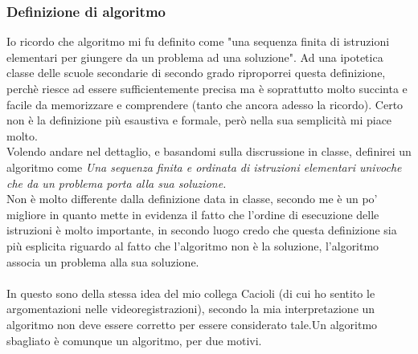 \documentclass[a4paper]{article}
\begin{document}
\subsubsection{Definizione di algoritmo}
Io ricordo che algoritmo mi fu definito come "una sequenza finita di istruzioni elementari per giungere da un problema ad una soluzione". Ad una ipotetica classe delle scuole secondarie di secondo grado riproporrei questa definizione, perchè riesce ad essere sufficientemente precisa ma è soprattutto molto succinta e facile da memorizzare e comprendere (tanto che ancora adesso la ricordo). Certo non è la definizione più esaustiva e formale, però nella sua semplicità mi piace molto.\\
Volendo andare nel dettaglio, e basandomi sulla discrussione in classe, definirei un algoritmo come \emph{Una sequenza finita e ordinata di istruzioni elementari univoche che da un problema porta alla sua soluzione.}\\
Non è molto differente dalla definizione data in classe, secondo me è un po' migliore in quanto mette in evidenza il fatto che l'ordine di esecuzione delle istruzioni è molto importante, in secondo luogo credo che questa definizione sia più esplicita riguardo al fatto che l'algoritmo non è la soluzione, l'algoritmo associa un problema alla sua soluzione.\\\\
In questo sono della stessa idea del mio collega Cacioli (di cui ho sentito le argomentazioni nelle videoregistrazioni), secondo la mia interpretazione un algoritmo non deve essere corretto per essere considerato tale.Un algoritmo sbagliato è comunque un algoritmo, per due motivi.
\end{document}
